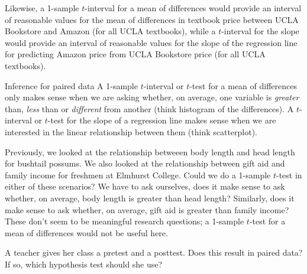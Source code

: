 Likewise, a 1-sample $t$-interval for a mean of differences would provide an interval of reasonable values for the mean of differences in textbook price between UCLA Bookstore and Amazon (for all UCLA textbooks), while a $t$-interval for the slope would provide an interval of reasonable values for the slope of the regression line for predicting Amazon price from UCLA Bookstore price (for all UCLA textbooks). 


\begin{onebox}{Inference for paired data}
A 1-sample $t$-interval or $t$-test for a mean of differences only makes sense when we are asking whether, on average, one variable is \emph{greater} than, \emph{less} than or \emph{different} from another (think histogram of the differences).  A $t$-interval or $t$-test for the slope of a regression line makes sense when we are interested in the linear relationship between them (think scatterplot).  
\end{onebox}


\begin{examplewrap}
\begin{nexample}
{Previously, we looked at the relationship betweeen body length and head length for bushtail possums.  We also looked at the relationship between gift aid and family income for freshmen at Elmhurst College.  Could we do a 1-sample $t$-test in either of these scenarios?}
We have to ask ourselves, does it make sense to ask whether, on average, body length is greater than head length?  Similarly, does it make sense to ask whether, on average, gift aid is greater than family income?  These don't seem to be meaningful research questions; a 1-sample $t$-test for a mean of differences would not be useful here. 
\end{nexample}
\end{examplewrap}

\begin{exercisewrap}
\begin{nexercise}
A teacher gives her class a pretest and a posttest.  Does this result in paired data?  If so, which hypothesis test should she use?\footnotemark
\end{nexercise}
\end{exercisewrap}


